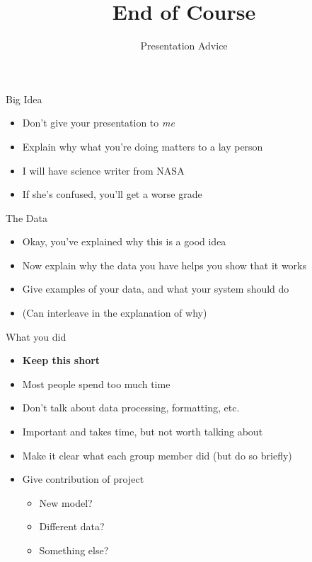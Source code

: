\documentclass[compress]{beamer}
\title{End of Course}
\date{Presentation Advice}
\begin{document}
\frame{\titlepage
}

\begin{frame}{Big Idea}

  \begin{itemize}
    \item Don't give your presentation to \emph{me}
    \item Explain why what you're doing matters to a lay person
    \item I will have science writer from NASA
    \item If she's confused, you'll get a worse grade
  \end{itemize}

\end{frame}

\begin{frame}{The Data}

  \begin{itemize}
    \item Okay, you've explained why this is a good idea
    \item Now explain why the data you have helps you show that it works
    \item Give examples of your data, and what your system should do
    \item (Can interleave in the explanation of why)
  \end{itemize}

\end{frame}

\begin{frame}{What you did}

  \begin{itemize}
    \item {\bf Keep this short}
    \item Most people spend too much time
    \item Don't talk about data processing, formatting, etc.
    \item Important and takes time, but not worth talking about
    \item Make it clear what each group member did (but do so briefly)
    \item Give contribution of project
      \begin{itemize}
        \item New model?
        \item Different data?
        \item Something else?
      \end{itemize}
  \end{itemize}

\end{frame}
\end{document}
